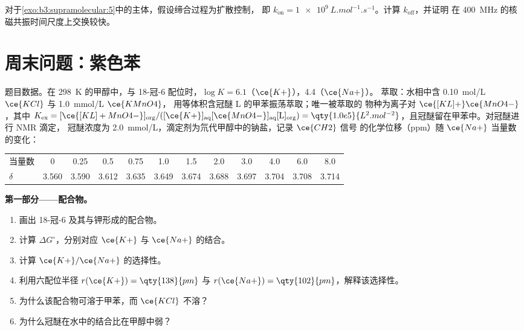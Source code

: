 \begin{exercise}[$\star\star\star$]\label{exo:b3:supramolecular:12}
对于\cref{exo:b3:supramolecular:5}中的主体，假设缔合过程为扩散控制，
即 $k_{\mathrm{on}} = \qty{1e9}{L.mol^{-1}.s^{-1}}$。计算 $k_{\mathrm{off}}$，并证明
在 \qty{400}{MHz} 的核磁共振时间尺度上交换较快。
\end{exercise}

\section{周末问题：紫色苯}

\begin{problem}
\label{pb:b3:supramolecular:1}
题目数据。在 \qty{298}{K} 的甲醇中，与 18-冠-6 配位时，$\log K = 6.1$（$\ce{K+}$），4.4（$\ce{Na+}$）。
萃取：水相中含 \qty{0.10}{mol/L} $\ce{KCl}$ 与 \qty{1.0}{mmol/L} $\ce{KMnO4}$，
用等体积含冠醚 L 的甲苯振荡萃取；唯一被萃取的
物种为离子对 $\ce{[KL]+}\ce{MnO4-}$，其中
$K_{\mathrm{ex}} = [\ce{[KL]+MnO4-}]_{\mathrm{org}}/([\ce{K+}]_{\mathrm{aq}}[\ce{MnO4-}]_{\mathrm{aq}}[\mathrm L]_{\mathrm{org}}) = \qty{1.0e5}{L^2.mol^{-2}}$，且冠醚留在甲苯中。对冠醚进行 NMR 滴定，
冠醚浓度为 \qty{2.0}{mmol/L}，滴定剂为氘代甲醇中的钠盐，记录 $\ce{CH2}$ 信号
的化学位移（ppm）随 $\ce{Na+}$ 当量数的变化：

\begin{center}\small
\begin{tabular}{l*{11}{c}}
\hline
当量数 & 0 & 0.25 & 0.5 & 0.75 & 1.0 & 1.5 & 2.0 & 3.0 & 4.0 & 6.0 & 8.0\\
$\delta$ & 3.560 & 3.590 & 3.612 & 3.635 & 3.649 & 3.674 & 3.688 & 3.697 & 3.704 & 3.708 & 3.714\\
\hline
\end{tabular}
\end{center}

\medskip\noindent\textbf{第一部分——配合物。}
\begin{enumerate}
  \item 画出 18-冠-6 及其与钾形成的配合物。
  \item 计算 $\Delta G^\circ$，分别对应 $\ce{K+}$ 与 $\ce{Na+}$ 的结合。
  \item 计算 $\ce{K+}/\ce{Na+}$ 的选择性。
  \item 利用六配位半径 $r(\ce{K+}) = \qty{138}{pm}$ 与 $r(\ce{Na+}) = \qty{102}{pm}$，解释该选择性。
  \item 为什么该配合物可溶于甲苯，而 $\ce{KCl}$ 不溶？
  \item 为什么冠醚在水中的结合比在甲醇中弱？
\end{enumerate}


\end{problem}
